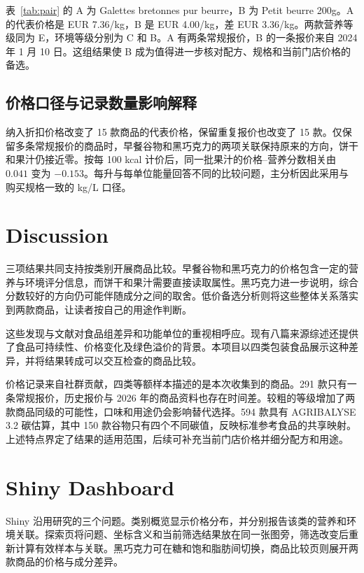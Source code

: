 \documentclass[11pt,a4paper,onecolumn,oneside]{tau-class/tau}
\begin{document}
\begin{table}[!ht]\centering\small\caption{两款饼干的实例。B 的历史单位价低 45.7\%，营养等级相同，环境等级更好。}\label{tab:pair}\end{table}
表~\ref{tab:pair} 的 A 为 Galettes bretonnes pur beurre，B 为 Petit beurre 200g。A 的代表价格是 EUR 7.36/kg，B 是 EUR 4.00/kg，差 EUR 3.36/kg。两款营养等级同为 E，环境等级分别为 C 和 B。A 有两条常规报价，B 的一条报价来自 2024 年 1 月 10 日。这组结果使 B 成为值得进一步核对配方、规格和当前门店价格的备选。

\subsection{价格口径与记录数量影响解释}
纳入折扣价格改变了 15 款商品的代表价格，保留重复报价也改变了 15 款。仅保留多条常规报价的商品时，早餐谷物和黑巧克力的两项关联保持原来的方向，饼干和果汁仍接近零。按每 100 kcal 计价后，同一批果汁的价格--营养分数相关由 $0.041$ 变为 $-0.153$。每升与每单位能量回答不同的比较问题，主分析因此采用与购买规格一致的 kg/L 口径。

\section{Discussion}
三项结果共同支持按类别开展商品比较。早餐谷物和黑巧克力的价格包含一定的营养与环境评分信息，而饼干和果汁需要直接读取属性。黑巧克力进一步说明，综合分数较好的方向仍可能伴随成分之间的取舍。低价备选分析则将这些整体关系落实到两款商品，让读者按自己的用途作判断。

这些发现与文献对食品组差异和功能单位的重视相呼应\cite{masset2015,martinez2025}。现有八篇来源综述还提供了食品可持续性、价格变化及绿色溢价的背景\cite{masset2014,hoenink2024,nakavachara2025,clark2022,desiderio2026,bai2025}。本项目以四类包装食品展示这种差异，并将结果转成可以交互检查的商品比较。

价格记录来自社群贡献，四类等额样本描述的是本次收集到的商品。291 款只有一条常规报价，历史报价与 2026 年的商品资料也存在时间差。较粗的等级增加了两款商品同级的可能性，口味和用途仍会影响替代选择。594 款具有 AGRIBALYSE 3.2 碳估算，其中 150 款谷物只有四个不同碳值，反映标准参考食品的共享映射。上述特点界定了结果的适用范围，后续可补充当前门店价格并细分配方和用途。

\section{Shiny Dashboard}
Shiny 沿用研究的三个问题。类别概览显示价格分布，并分别报告该类的营养和环境关联。探索页将问题、坐标含义和当前筛选结果放在同一张图旁，筛选改变后重新计算有效样本与关联。黑巧克力可在糖和饱和脂肪间切换，商品比较页则展开两款商品的价格与成分差异。
\end{document}
